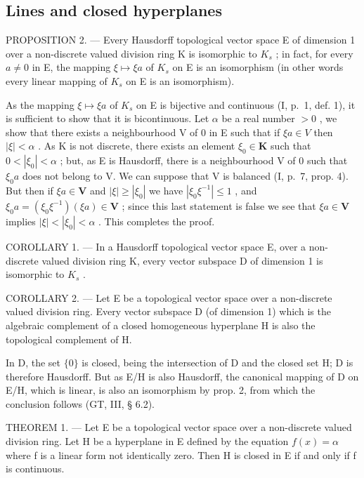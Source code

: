 \subsection{Lines and closed hyperplanes}

PROPOSITION 2. --- Every Hausdorff topological vector space E of dimension 1 over a non-discrete valued division ring K is isomorphic to \(K_{s}\) ; in fact, for every \(a \neq 0\) in E, the mapping \(\xi \mapsto \xi a\) of \(K_{s}\) on E is an isomorphism (in other words every linear mapping of \(K_{s}\) on E is an isomorphism).

As the mapping \(\xi \mapsto \xi a\) of \(K_{s}\) on E is bijective and continuous (I, p.~1, def. 1), it is sufficient to show that it is bicontinuous. Let \(\alpha\) be a real number \(>0\) , we show that there exists a neighbourhood V of 0 in E such that if \(\xi a \in V\) then \(|\xi| < \alpha\) . As K is not discrete, there exists an element \(\xi_0 \in \mathbf{K}\) such that \(0 < |\xi_0| < \alpha\) ; but, as E is Hausdorff, there is a neighbourhood V of 0 such that \(\xi_0a\) does not belong to V. We can suppose that V is balanced (I, p.~7, prop. 4). But then if \(\xi a \in \mathbf{V}\) and \(|\xi| \geqslant |\xi_0|\) we have \(|\xi_0\xi^{-1}| \leqslant 1\) , and \(\xi_0a = (\xi_0\xi^{-1})(\xi a) \in \mathbf{V}\) ; since this last statement is false we see that \(\xi a \in \mathbf{V}\) implies \(|\xi| < |\xi_0| < \alpha\) . This completes the proof.

COROLLARY 1. --- In a Hausdorff topological vector space E, over a non-discrete valued division ring K, every vector subspace D of dimension 1 is isomorphic to \(K_{s}\) .

COROLLARY 2. --- Let E be a topological vector space over a non-discrete valued division ring. Every vector subspace D (of dimension 1) which is the algebraic complement of a closed homogeneous hyperplane H is also the topological complement of H.

In D, the set \(\{0\}\) is closed, being the intersection of D and the closed set H; D is therefore Hausdorff. But as E/H is also Hausdorff, the canonical mapping of D on E/H, which is linear, is also an isomorphism by prop. 2, from which the conclusion follows (GT, III, § 6.2).

THEOREM 1. --- Let E be a topological vector space over a non-discrete valued division ring. Let H be a hyperplane in E defined by the equation \(f(x) = \alpha\) where f is a linear form not identically zero. Then H is closed in E if and only if f is continuous.

